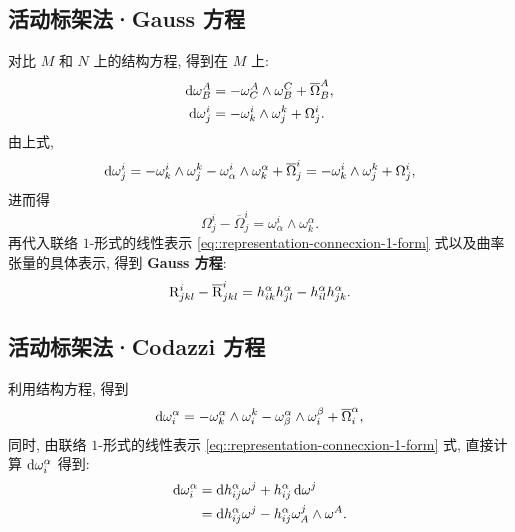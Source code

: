 \subsection{活动标架法·Gauss 方程}
对比 $M$ 和 $N$ 上的结构方程, 得到在 $M$ 上:
\begin{align*}
\mathop{}\!\mathrm{d}\omega^{A}_{B} &= -\omega^{A}_{C} \wedge \omega^{C}_{B} + \overline{\Omega}^{A}_{B}, \\
\mathop{}\!\mathrm{d}\omega^{i}_{j} &= -\omega^{i}_{k} \wedge \omega^{k}_{j} + \Omega^{i}_{j}.
\end{align*}
由上式,
$$
	\mathop{}\!\mathrm{d}\omega^{i}_{j} = -\omega^{i}_{k} \wedge \omega^{k}_{j} - \omega^{i}_{\alpha} \wedge \omega^{\alpha}_{k} + \overline{\Omega}^{i}_{j} = -\omega^{i}_{k} \wedge \omega^{k}_{j} + \Omega^{i}_{j},
$$
进而得
$$
	\Omega^{i}_{j} - \overline{\Omega}^{i}_{j} = \omega^{i}_{\alpha} \wedge \omega^{\alpha}_{k}.
$$
再代入联络 $1$-形式的线性表示 \ref{eq::representation-connecxion-1-form} 式以及曲率张量的具体表示, 得到 {\bf Gauss 方程}:
\begin{equation}\label{eq::Gauss-equation-local}
	\mathrm{R}^{i}_{jkl} - \overline{\mathrm{R}}^{i}_{jkl} = h^{\alpha}_{ik}h^{\alpha}_{jl} - h^{\alpha}_{il}h^{\alpha}_{jk}.
\end{equation}

\subsection{活动标架法·Codazzi 方程}
利用结构方程, 得到
\[
	\mathop{}\!\mathrm{d}\omega^{\alpha}_{i} = -\omega^{\alpha}_{k} \wedge \omega^{k}_{i} - \omega^{\alpha}_{\beta} \wedge \omega^{\beta}_{i} + \overline{\Omega}^{\alpha}_{i},
\]
同时, 由联络 $1$-形式的线性表示 \ref{eq::representation-connecxion-1-form} 式, 直接计算 $\mathop{}\!\mathrm{d}\omega^{\alpha}_{i}$ 得到:
\begin{align*}
	\mathop{}\!\mathrm{d}\omega^{\alpha}_{i} &= \mathop{}\!\mathrm{d} h^{\alpha}_{ij}\omega^{j} + h^{\alpha}_{ij}\mathop{}\!\mathrm{d}\omega^{j} \\
	&= \mathop{}\!\mathrm{d} h^{\alpha}_{ij}\omega^{j} - h^{\alpha}_{ij}\omega^{j}_{A} \wedge \omega^{A}.
\end{align*}